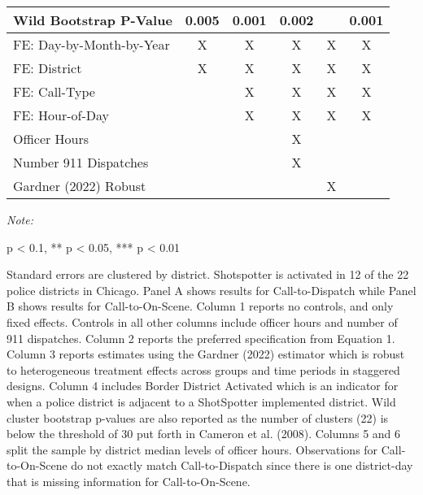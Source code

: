 \begin{table}[H]
\begin{threeparttable}
\begin{tabular}[t]{lccccc}
\hspace{1em}Wild Bootstrap P-Value & 0.005 & 0.001 & 0.002 &  & 0.001\\
\midrule
FE: Day-by-Month-by-Year & X & X & X & X & X\\
FE: District & X & X & X & X & X\\
FE: Call-Type &  & X & X & X & X\\
FE: Hour-of-Day &  & X & X & X & X\\
Officer Hours &  &  & X &  & \\
Number 911 Dispatches &  &  & X &  & \\
Gardner (2022) Robust &  &  &  & X & \\
\bottomrule
\end{tabular}
\begin{tablenotes}
\item \textit{Note: } 
\item * p < 0.1, ** p < 0.05, *** p < 0.01
\item Standard errors are clustered by district.                   Shotspotter is activated in 12 of the 22 police districts in Chicago.                  Panel A shows results for Call-to-Dispatch while                  Panel B shows results for Call-to-On-Scene. Column 1 reports no controls, and                   only fixed effects. Controls in all other columns include                  officer hours and number of 911 dispatches. Column 2 reports the preferred                  specification from Equation 1. Column 3 reports estimates using                  the Gardner (2022) estimator which is robust to                   heterogeneous treatment effects across groups and time periods                  in staggered designs. Column 4 includes Border District Activated                  which is an indicator for when a police district is adjacent to a ShotSpotter                  implemented district. Wild cluster bootstrap p-values are also reported                  as the number of clusters (22) is below the threshold of 30 put forth in                  Cameron et al. (2008). Columns 5 and 6 split the sample by district median                  levels of officer hours. Observations for Call-to-On-Scene                      do not exactly match Call-to-Dispatch since there is one district-day                      that is missing information for Call-to-On-Scene.                   
\end{tablenotes}
\end{threeparttable}
\end{table}
